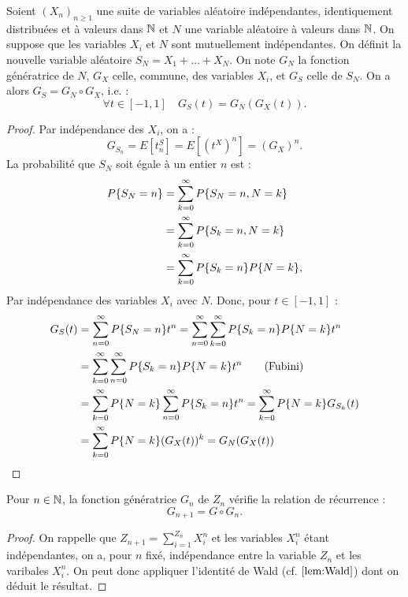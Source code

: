 \begin{lem}
\label{lem:Wald}
Soient $(X_n)_{n \geq 1}$ une suite de variables aléatoire indépendantes, identiquement distribuées et à valeurs dans $\mathbb{N}$ 
et $N$ une variable aléatoire à valeurs dans $\mathbb{N}$. On suppose que les variables $X_i$ et $N$ sont mutuellement indépendantes.
On définit la nouvelle variable aléatoire $S_N = X_1 + \dots + X_N$.
On note $G_N$ la fonction génératrice de $N$, $G_X$ celle, commune, des variables $X_i$, et $G_S$ celle de $S_N$.
On a alors $G_S = G_N \circ G_X$, i.e. :
\[ \forall t \in [-1, 1] \quad G_S(t) = G_N(G_X(t)) . \]
\end{lem}

\begin{proof}
Par indépendance des $X_i$, on a :
\[ G_{S_n} = E[t^S_n] = E[(t^X)^n] = (G_X)^n . \]
La probabilité que $S_N$ soit égale à un entier $n$ est :
\begin{align*}
P\{ S_N = n \} & = \sum_{k=0}^{\infty} P\{ S_N = n, N=k \} \\
& = \sum_{k=0}^{\infty} P\{ S_k = n, N=k \} \\
& = \sum_{k=0}^{\infty} P\{ S_k = n \} P\{  N=k \},
\end{align*}
Par indépendance des variables $X_i$ avec $N$. Donc, pour $t \in [-1, 1]$ :
\begin{align*}
G_S(t) & = \sum_{n=0}^{\infty} P \{ S_N = n \} t^n  = \sum_{n=0}^{\infty}  \sum_{k=0}^{\infty} P\{ S_k = n \} P\{  N=k \} t^n \\
& = \sum_{k=0}^{\infty} \sum_{n=0}^{\infty} P\{ S_k = n \} P\{ N=k \} t^n \qquad \text{(Fubini)} \\
& = \sum_{k=0}^{\infty} P\{ N=k \} \sum_{n=0}^{\infty} P\{ S_k = n \} t^n = \sum_{k=0}^{\infty} P\{ N=k \} G_{S_k}(t) \\
& = \sum_{k=0}^{\infty} P\{ N=k \} (G_X(t))^k = G_N(G_X(t))
\end{align*}
\end{proof}

\begin{thm}
Pour $n \in \mathbb{N}$, la fonction génératrice $G_n$ de $Z_n$ vérifie la relation de récurrence :
\[ G_{n+1} = G \circ G_n . \]
\end{thm}

\begin{proof}
On rappelle que $Z_{n+1} = \sum_{i=1}^{Z_n} X_i^n$ et les variables $X_i^n$ étant indépendantes, on a, pour $n$ fixé, 
indépendance entre la variable $Z_n$ et les varibales $X_i^n$. On peut donc appliquer l'identité de Wald (cf. $\ref{lem:Wald}$) dont 
on déduit le résultat.
\end{proof}

